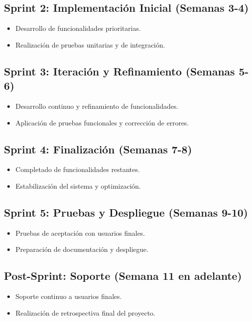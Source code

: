 \documentclass[conference]{IEEEtran}
\begin{document}
\subsection{Sprint 2: Implementación Inicial (Semanas 3-4)}
\begin{itemize}
    \item Desarrollo de funcionalidades prioritarias.
    \item Realización de pruebas unitarias y de integración.
\end{itemize}

\subsection{Sprint 3: Iteración y Refinamiento (Semanas 5-6)}
\begin{itemize}
    \item Desarrollo continuo y refinamiento de funcionalidades.
    \item Aplicación de pruebas funcionales y corrección de errores.
\end{itemize}

\subsection{Sprint 4: Finalización (Semanas 7-8)}
\begin{itemize}
    \item Completado de funcionalidades restantes.
    \item Estabilización del sistema y optimización.
\end{itemize}

\subsection{Sprint 5: Pruebas y Despliegue (Semanas 9-10)}
\begin{itemize}
    \item Pruebas de aceptación con usuarios finales.
    \item Preparación de documentación y despliegue.
\end{itemize}

\subsection{Post-Sprint: Soporte (Semana 11 en adelante)}
\begin{itemize}
    \item Soporte continuo a usuarios finales.
    \item Realización de retrospectiva final del proyecto.
\end{itemize}
\end{document}
